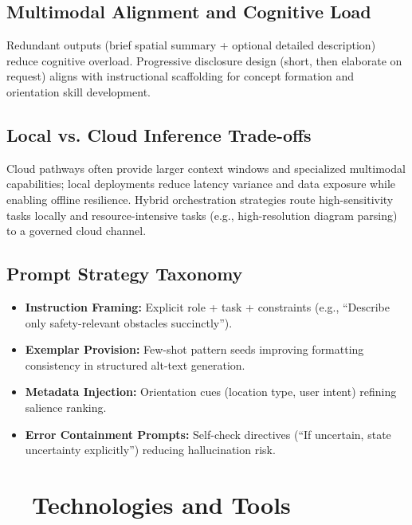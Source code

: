 \subsection{Multimodal Alignment and Cognitive Load}
Redundant outputs (brief spatial summary + optional detailed description) reduce cognitive overload. Progressive disclosure design (short, then elaborate on request) aligns with instructional scaffolding for concept formation and orientation skill development.

\subsection{Local vs. Cloud Inference Trade-offs}
Cloud pathways often provide larger context windows and specialized multimodal capabilities; local deployments reduce latency variance and data exposure while enabling offline resilience. Hybrid orchestration strategies route high-sensitivity tasks locally and resource-intensive tasks (e.g., high-resolution diagram parsing) to a governed cloud channel.

\subsection{Prompt Strategy Taxonomy}
\begin{itemize}
	\item \textbf{Instruction Framing:} Explicit role + task + constraints (e.g., ``Describe only safety-relevant obstacles succinctly'').
	\item \textbf{Exemplar Provision:} Few-shot pattern seeds improving formatting consistency in structured alt-text generation.
	\item \textbf{Metadata Injection:} Orientation cues (location type, user intent) refining salience ranking.
	\item \textbf{Error Containment Prompts:} Self-check directives (``If uncertain, state uncertainty explicitly'') reducing hallucination risk.
\end{itemize}

\section{~~Technologies and Tools}\label{ch9:sec:technologies-tools}

